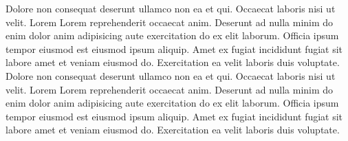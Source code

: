 \documentclass[12pt]{report}
\begin{document}
Dolore non consequat deserunt ullamco non ea et qui. Occaecat laboris nisi ut velit. Lorem Lorem reprehenderit occaecat anim. Deserunt ad nulla minim do enim dolor anim adipisicing aute exercitation do ex elit laborum. Officia ipsum tempor eiusmod est eiusmod ipsum aliquip. Amet ex fugiat incididunt fugiat sit labore amet et veniam eiusmod do. Exercitation ea velit laboris duis voluptate.
Dolore non consequat deserunt ullamco non ea et qui. Occaecat laboris nisi ut velit. Lorem Lorem reprehenderit occaecat anim. Deserunt ad nulla minim do enim dolor anim adipisicing aute exercitation do ex elit laborum. Officia ipsum tempor eiusmod est eiusmod ipsum aliquip. Amet ex fugiat incididunt fugiat sit labore amet et veniam eiusmod do. Exercitation ea velit laboris duis voluptate.
\end{document}

